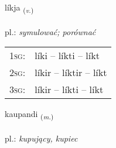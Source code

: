 \documentclass[frontgrid, backgrid]{flacards}\usepackage[]{graphicx}\usepackage[]{xcolor}
\begin{document}
\renewcommand{\flhead}{\vskip5pt \fboxsep=0pt {\small\bfseries\footnotesize Sagnorð | Verb}}
\renewcommand{\fcfoot}{\vskip5pt \fboxsep=0pt \hspace{2pt}{\small\bfseries\footnotesize 2K}}

\renewcommand{\blhead}{\vskip5pt {\small\bfseries\footnotesize Sagnorð | Verb }}
\renewcommand{\bcfoot}{\vskip5pt \hspace{2pt}{\small\bfseries\footnotesize 2K}}


{líkja \small{\textsubscript{(\textit{v.})}} \\[1ex] %
\textphonetic{[liːca]} \\
pl.: \emph{symulować; porównać} \\  [2ex]
\renewcommand*{\arraystretch}{0.8}
\begin{tabular}{p{1cm}l}
\textsc{1sg}: & líki -- líkti -- líkt \\ 
\textsc{2sg}: & líkir -- líktir -- líkt \\ 
\textsc{3sg}: & líkir -- líkti -- líkt \\ 
\end{tabular}
}

\renewcommand{\flhead}{\vskip5pt \fboxsep=0pt {\small\bfseries\footnotesize Nafnorð | Noun}}
\renewcommand{\fcfoot}{\vskip5pt \fboxsep=0pt \hspace{2pt}{\small\bfseries\footnotesize 2K}}

\renewcommand{\blhead}{\vskip5pt {\small\bfseries\footnotesize Nafnorð | Noun }}
\renewcommand{\bcfoot}{\vskip5pt \hspace{2pt}{\small\bfseries\footnotesize 2K}}


{kaupandi \small{\textsubscript{(\textit{m.})}} \\[1ex] %
\textphonetic{[kʰœiːpantɪ]} \\
pl.: \emph{kupujący, kupiec} \\  [2ex]
\renewcommand*{\arraystretch}{0.8}
}
\end{document}

